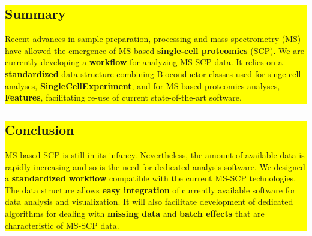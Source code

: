 \documentclass{article}
\newcommand{\hcode}[2][lgray]{{\ttfamily\color{vdgray}\colorbox{#1}{#2}}}
\begin{document}
\noindent
\colorbox{yellow}{
  \noindent
  \begin{minipage}[t]{13.7cm}
  \vspace{.15cm}
    \section*{\huge Summary}
    \large 
    Recent advances in sample preparation, processing and mass spectrometry (MS) have allowed the emergence of MS-based \textbf{single-cell proteomics} (SCP). We are currently developing a \textbf{workflow} for analyzing MS-SCP data. It relies on a \textbf{standardized} data structure combining Bioconductor classes used for singe-cell analyses, \textbf{\hcode[yellow]{SingleCellExperiment}}\cite{SCE}, and for MS-based proteomics analyses, \textbf{\hcode[yellow]{Features}}\cite{Features}, facilitating re-use of current state-of-the-art software.
    \vspace{0.1cm}
  \end{minipage}
}
\hspace{0.37cm}
\noindent
\colorbox{yellow}{
  \begin{minipage}[t]{13.6cm}
    \vspace{.2cm}
    \section*{\huge Conclusion}
    \large
    MS-based SCP is still in its infancy. Nevertheless, the amount of available data is rapidly increasing and so is the need for dedicated analysis software. We designed a \textbf{standardized workflow} compatible with the current MS-SCP technologies. The data structure allows \textbf{easy integration} of currently available software for data analysis and visualization. It will also facilitate development of dedicated algorithms for dealing with \textbf{missing data} and \textbf{batch effects} that are characteristic of MS-SCP data.
    \vspace{0.15cm}
 \end{minipage}
}
\vspace{-1cm}
\end{document}
